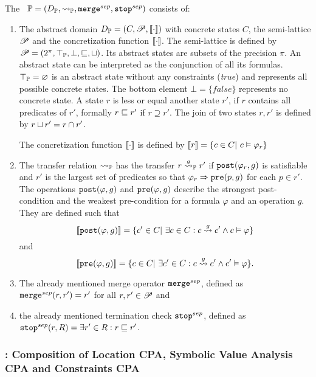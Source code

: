 The \predicateCPA\ $\mathbb{P} = (D_{\mathbb{P}}, \rightsquigarrow_{\mathbb{P}}, \texttt{merge}^{sep}, \texttt{stop}^{sep})$ consists of:
\begin{enumerate}[leftmargin=*, label=\arabic*.]
\item The abstract domain
	$D_{\mathbb{P}} = (C, \mathscr{P}, [\![ \cdot ]\!])$ with concrete states $C$, the semi-lattice $\mathscr{P}$ and the concretization function $[\![ \cdot ]\!]$.
	The semi-lattice is defined by $\mathscr{P} = (2^{\pi}, \top_{\mathbb{P}}, \bot, \sqsubseteq, \sqcup)$. Its abstract states are subsets of the precision $\pi$.
	An abstract state can be interpreted as the conjunction of all its formulas. $\top_{\mathbb{P}} = \varnothing$ is an abstract state without any constraints (\emph{true}) and represents all possible concrete states.
	The bottom element $\bot = \{false\}$ represents no concrete state. A state $r$ is less or equal another state $r'$, if $r$ contains all predicates of $r'$, formally $r \sqsubseteq r'$ if $r \supseteq r'$.
	The join of two states $r, r'$ is defined by $r \sqcup r' = r \cap r'$.

	The concretization function $[\![ \cdot ]\!]$ is defined by $[\![ r ]\!] = \{ c \in C |\ c \vDash \varphi_r\}$

\item The transfer relation $\rightsquigarrow_{\mathbb{P}}$ has the transfer $r \overset{g}{\rightsquigarrow}_{\mathbb{P}} r'$ if $\texttt{post}(\varphi_r, g)$ is satisfiable
	and $r'$ is the largest set of predicates so that $\varphi_r \Rightarrow \texttt{pre}(p, g)$ for each $p \in r'$.
	The operations $\texttt{post}(\varphi, g)$ and $\texttt{pre}(\varphi, g)$ describe the strongest post-condition and the weakest pre-condition for a formula $\varphi$ and an operation $g$.
	They are defined such that
	\[[\![ \texttt{post}(\varphi, g) ]\!] = \{c' \in C |\ \exists c \in C : c \overset{g}{\rightsquigarrow} c' \wedge c \vDash \varphi \}\] and
	\[[\![ \texttt{pre}(\varphi, g) ]\!] = \{c \in C |\ \exists c' \in C : c \overset{g}{\rightsquigarrow} c' \wedge c' \vDash \varphi \}.\]
\item The already mentioned merge operator $\texttt{merge}^{sep}$, defined as $\texttt{merge}^{sep}(r, r') = r'$ for all $r, r' \in \mathscr{P}$ and
\item the already mentioned termination check $\texttt{stop}^{sep}$, defined as $\texttt{stop}^{sep}(r, R) = \exists r' \in R : r \sqsubseteq r'$.
\end{enumerate}

\subsubsection{\ValueAnalysisCPA}
\subsubsection{\SymbolicValueAnalysisCPA}
\subsubsection{\ConstraintsCPA}
\subsubsection{\CompositeCPA}
\subsubsection{\SymbolicExecutionCPA : Composition of Location CPA, Symbolic Value Analysis CPA and Constraints CPA}

